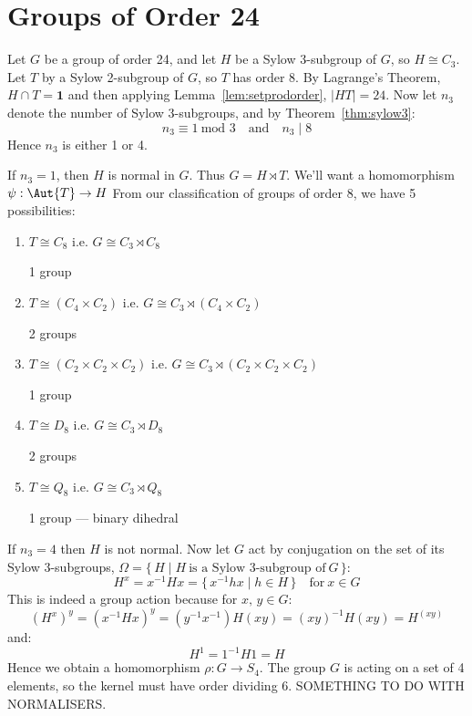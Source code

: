 \section{Groups of Order 24}
Let \(G\) be a group of order 24, and let \(H\) be a Sylow 3-subgroup of \(G\), so \(H \cong C_3\).
Let \(T\) by a Sylow 2-subgroup of \(G\), so \(T\) has order 8.
By Lagrange's Theorem, \(H \cap T = \bm{1}\) and then applying Lemma~\ref{lem:setprodorder}, \(|HT| = 24\).
Now let \(n_3\) denote the number of Sylow 3-subgroups, and by Theorem~\ref{thm:sylow3}:
\[n_3 \equiv 1\ \text{mod 3} \quad \text{and} \quad n_3 \mid 8\]
Hence \(n_3\) is either 1 or 4.

If \(n_3 = 1\), then \(H\) is normal in \(G\).
Thus \(G = H \rtimes T\).
We'll want a homomorphism \(\psi: \Aut{T} \to H\)
From our classification of groups of order 8, we have 5 possibilities:

\begin{enumerate}
    \item \(T \cong C_8\) i.e. \(G \cong C_3 \rtimes C_8\)
        
        1 group
    \item \(T \cong (C_4 \times C_2)\) i.e. \(G \cong C_3 \rtimes (C_4 \times C_2)\)
    
        2 groups
    \item \(T \cong (C_2 \times C_2 \times C_2)\) i.e. \(G \cong C_3 \rtimes (C_2 \times C_2 \times C_2)\)

        1 group
    \item \(T \cong D_8\) i.e. \(G \cong C_3 \rtimes D_8\)
        
        2 groups
    \item \(T \cong Q_8\) i.e. \(G \cong C_3 \rtimes Q_8\)

        1 group --- binary dihedral
\end{enumerate}

If \(n_3 = 4\) then \(H\) is not normal.
Now let \(G\) act by conjugation on the set of its Sylow 3-subgroups, \(\Omega = \{\,H \mid H\ \text{is a Sylow
3-subgroup of}\ G\,\}\):
\[H^x = x^{-1}Hx = \{\,x^{-1}hx \mid h \in H\,\} \quad \text{for}\ x \in G\]
This is indeed a group action because for \(x,\,y \in G\):
\[{(H^x)}^y = {(x^{-1}Hx)}^y = (y^{-1}x^{-1})H(xy) = {(xy)}^{-1}H(xy) = H^{(xy)}\]
and:
\[H^1 = 1^{-1}H1 = H\]
Hence we obtain a homomorphism \(\rho:G \to S_4\).
The group \(G\) is acting on a set of 4 elements, so the kernel must have order dividing 6.
SOMETHING TO DO WITH NORMALISERS.

